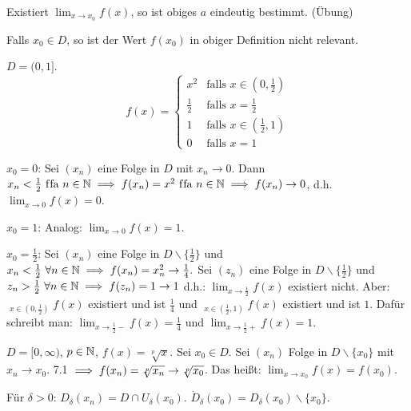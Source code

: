 \documentclass[a4paper,oneside,DIV15,BCOR12mm]{scrbook}
\begin{document}
\begin{bemerkung}
\begin{liste}
\item Existiert $\displaystyle\lim_{x\to x_0}f(x)$, so ist obiges $a$ eindeutig bestimmt. (Übung)
\item Falls $x_0 \in D$, so ist der Wert $f(x_0)$ in obiger Definition nicht relevant.
\end{liste}
\end{bemerkung}

\begin{beispiele}
\item $D= (0,1]$. $$f(x) = \begin{cases} x^2 & \text{falls }x\in(0,\frac{1}{2}) \\ \frac{1}{2} & \text{falls }x=\frac{1}{2} \\ 1 & \text{falls } x \in(\frac{1}{2},1) \\ 0 & \text{falls } x= 1\end{cases}$$

$x_0=0$: Sei $(x_n)$ eine Folge in $D$ mit $x_n \to 0$. Dann $x_n < \frac{1}{2} \text{ f\/fa } n\in\mathbb{N} \implies f(x_n) = x^2 \text{ f\/fa } n\in\mathbb{N} \implies f(x_n) \to 0$, d.h. $\displaystyle\lim_{x\to0}f(x) = 0$.

$x_0 = 1$: Analog: $\displaystyle\lim_{x\to0}f(x) = 1$.

$x_0= \frac{1}{2}$: Sei $(x_n)$ eine Folge in $D\backslash\{\frac{1}{2}\}$ und $x_n < \frac{1}{2} \ \forall n\in\mathbb{N} \implies f(x_n) = x_n^2 \to \frac{1}{4}.$
Sei $(z_n)$ eine Folge in $D\backslash\{\frac{1}{2}\}$ und $z_n > \frac{1}{2} \ \forall n\in\mathbb{N} \implies f(z_n) = 1 \to 1$
d.h.: $\displaystyle\lim_{x\to\frac{1}{2}}f(x)$ existiert nicht. Aber: $\displaystyle\mathop{\lim_{x\to\frac{1}{2}}}_{x\in(0,\frac{1}{2})} f(x)$ existiert und ist $\frac{1}{4}$ und $\displaystyle\mathop{\lim_{x\to\frac{1}{2}}}_{x\in(\frac{1}{2},1)} f(x)$ existiert und ist $1$. Dafür schreibt man: $\displaystyle\lim_{x\to\frac{1}{2}-} f(x)=\frac{1}{4}$ und $\displaystyle\lim_{x\to\frac{1}{2}+} f(x)=1$.

\item $D=[0,\infty)$, $p\in\mathbb{N}$, $f(x) = \sqrt[p]{x}$. Sei $x_0 \in D$. Sei $(x_n)$ Folge in $D\backslash\{x_0\}$ mit $x_n \to x_0$. 7.1 $\implies f(x_n)=\sqrt[p]{x_n} \to \sqrt[p]{x_0}$. Das heißt: $\displaystyle\lim_{x\to x_0 } f(x) = f(x_0)$.
\end{beispiele}

\begin{vereinbarung}
Für $\delta >0$: $D_\delta(x_n) = D \cap U_\delta(x_0)$. $\dot D_\delta(x_0) = D_\delta(x_0) \backslash \{x_0\}$.
\end{vereinbarung}
\end{document}
